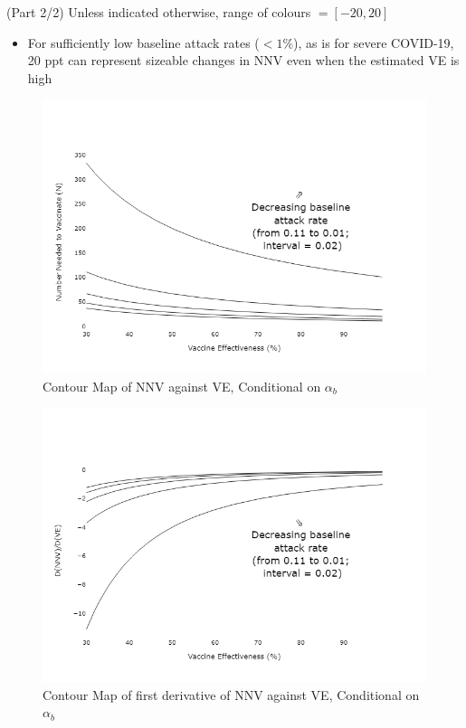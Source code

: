 \documentclass[aspectratio=169]{beamer}
\begin{document}
\begin{frame}{(Part 2/2) Unless indicated otherwise, range of colours $ = [-20, 20]$}
	\footnotesize
	\begin{itemize}
		\item For sufficiently low baseline attack rates ($<1\%$), as is for severe COVID-19, 20 ppt can represent sizeable changes in NNV even when the estimated VE is high
	\end{itemize}
	\begin{minipage}{0.48\linewidth}
		\begin{figure}[H]
			\caption{Contour Map of NNV against VE, Conditional on $\alpha_{b}$}
			\centering
			\includegraphics[scale=0.26]{VEMethod_NNVmap_NNV.png}
		\end{figure}
	\end{minipage}
	\begin{minipage}{0.48\linewidth}
		\begin{figure}[H]
			\centering
			\caption{Contour Map of first derivative of NNV against VE, Conditional on $\alpha_{b}$}
			\includegraphics[scale=0.26]{VEMethod_NNVmap_Dnnv.png}
		\end{figure}
	\end{minipage}
\end{frame}
\end{document}
